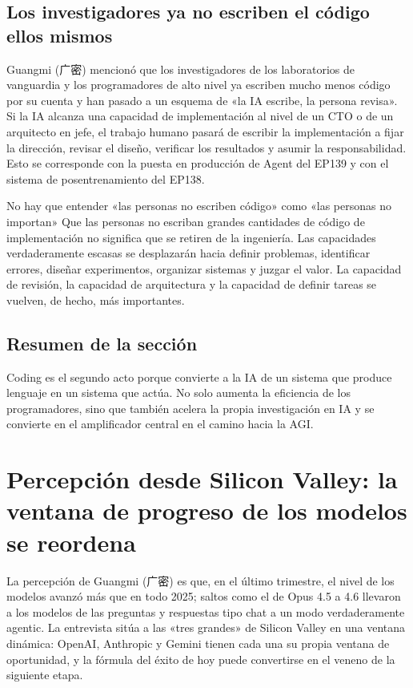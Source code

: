 \documentclass[a4paper]{article}
\begin{document}
\subsection{Los investigadores ya no escriben el código ellos mismos}

Guangmi (广密) mencionó que los investigadores de los laboratorios de vanguardia y los programadores de alto nivel ya escriben mucho menos código por su cuenta y han pasado a un esquema de «la IA escribe, la persona revisa». Si la IA alcanza una capacidad de implementación al nivel de un CTO o de un arquitecto en jefe, el trabajo humano pasará de escribir la implementación a fijar la dirección, revisar el diseño, verificar los resultados y asumir la responsabilidad. Esto se corresponde con la puesta en producción de Agent del EP139 y con el sistema de posentrenamiento del EP138.

\begin{warningbox}{No hay que entender «las personas no escriben código» como «las personas no importan»}
Que las personas no escriban grandes cantidades de código de implementación no significa que se retiren de la ingeniería. Las capacidades verdaderamente escasas se desplazarán hacia definir problemas, identificar errores, diseñar experimentos, organizar sistemas y juzgar el valor. La capacidad de revisión, la capacidad de arquitectura y la capacidad de definir tareas se vuelven, de hecho, más importantes.
\end{warningbox}

\subsection{Resumen de la sección}

Coding es el segundo acto porque convierte a la IA de un sistema que produce lenguaje en un sistema que actúa. No solo aumenta la eficiencia de los programadores, sino que también acelera la propia investigación en IA y se convierte en el amplificador central en el camino hacia la AGI.
\section{Percepción desde Silicon Valley: la ventana de progreso de los modelos se reordena}

La percepción de Guangmi (广密) es que, en el último trimestre, el nivel de los modelos avanzó más que en todo 2025; saltos como el de Opus 4.5 a 4.6 llevaron a los modelos de las preguntas y respuestas tipo chat a un modo verdaderamente agentic. La entrevista sitúa a las «tres grandes» de Silicon Valley en una ventana dinámica: OpenAI, Anthropic y Gemini tienen cada una su propia ventana de oportunidad, y la fórmula del éxito de hoy puede convertirse en el veneno de la siguiente etapa.
\end{document}
